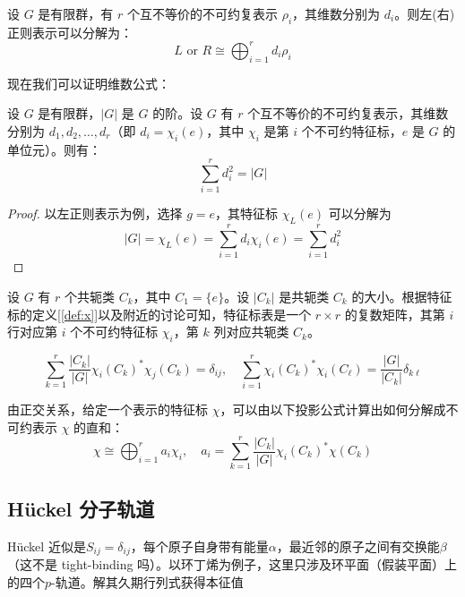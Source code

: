\begin{theorem}[正则表示的分解]
设 $G$ 是有限群，有 $r$ 个互不等价的不可约复表示 $\rho_i$，其维数分别为 $d_i$。则左(右)正则表示可以分解为：
\[L\text{ or }R \cong \bigoplus_{i=1}^r d_i \rho_i\]
\end{theorem}
现在我们可以证明维数公式：
\begin{theorem}[维数公式]
设 $G$ 是有限群，$|G|$ 是 $G$ 的阶。设 $G$ 有 $r$ 个互不等价的不可约复表示，其维数分别为 $d_1, d_2, \dots, d_r$（即 $d_i = \chi_i(e)$，其中 $\chi_i$ 是第 $i$ 个不可约特征标，$e$ 是 $G$ 的单位元）。则有：
\[\sum_{i=1}^r d_i^2 = |G|\]
\end{theorem}
\begin{proof}
以左正则表示为例，选择 $g=e$，其特征标 $\chi_L(e)$ 可以分解为
\[|G| = \chi_L(e) = \sum_{i=1}^r d_i \chi_i(e) = \sum_{i=1}^r d_i^2\]
\end{proof}

设 $G$ 有 $r$ 个共轭类 $C_k$，其中 $C_1 = \{e\}$。设 $|C_k|$ 是共轭类 $C_k$ 的大小。根据特征标的定义[\ref{def:x}]以及附近的讨论可知，特征标表是一个 $r \times r$ 的复数矩阵，其第 $i$ 行对应第 $i$ 个不可约特征标 $\chi_i$，第 $k$ 列对应共轭类 $C_k$。
\begin{theorem}
\[\sum_{k=1}^r \frac{|C_k|}{|G|} \chi_i(C_k)^*\chi_j(C_k) = \delta_{ij}, \quad \sum_{i=1}^r \chi_i(C_k)^*\chi_i(C_\ell) = \frac{|G|}{|C_k|} \delta_{k\ell}\]
\end{theorem}
由正交关系，给定一个表示的特征标 $\chi$，可以由以下投影公式计算出如何分解成不可约表示 $\chi$ 的直和：
\begin{equation}\label{eq:projection}
\chi \cong \bigoplus_{i=1}^r a_i \chi_i, \quad a_i=\sum_{k=1}^r \frac{|C_k|}{|G|} \chi_i(C_k)^*\chi(C_k) 
\end{equation}

\newpage
\subsection{H\"uckel 分子轨道}
H\"uckel 近似是$S_{ij}=\delta_{ij}$，每个原子自身带有能量$\alpha$，最近邻的原子之间有交换能$\beta$（这不是 tight-binding 吗）。以环丁烯为例子，这里只涉及环平面（假装平面）上的四个$p$-轨道。解其久期行列式获得本征值

